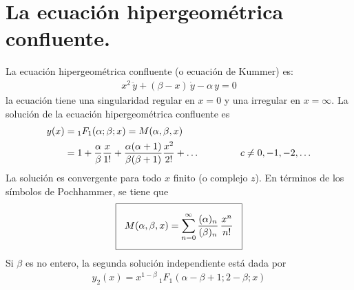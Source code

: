 \section{La ecuación hipergeométrica confluente.}
La ecuación hipergeométrica confluente (o ecuación de Kummer) es:
\begin{align*}
x^{2} \, \ddot{y} + (\beta - x) \, \dot{y} - \alpha \, y = 0
\end{align*}
la ecuación tiene una singularidad regular en $x=0$ y una irregular en $x=\infty$. La solución de la ecuación hipergeométrica confluente es
\begin{align*}
y(x) &= {}_{1} F_{1} (\alpha; \beta; x) = M(\alpha, \beta, x) \\
&= 1 + \dfrac{\alpha}{\beta} \dfrac{x}{1!} + \dfrac{\alpha (\alpha + 1)}{\beta (\beta + 1)} \dfrac{x^{2}}{2!} + \ldots \hspace{1.5cm} c \neq 0, -1, -2, \ldots 
\end{align*}
La solución es convergente para todo $x$ finito (o complejo $z$). En términos de los símbolos de Pochhammer, se tiene que
\begin{align*}
\setlength{\fboxsep}{3\fboxsep}\boxed{
M(\alpha, \beta, x) = \sum_{n=0}^{\infty} \dfrac{(\alpha)_{n}}{(\beta)_{n}} \, \dfrac{x^{n}}{n!}}
\end{align*}
Si $\beta$ es no entero, la segunda solución independiente está dada por
\begin{align*}
y_{2} (x) = x^{1-\beta} \, {}_{1} F_{1} (\alpha - \beta + 1; 2 - \beta; x)
\end{align*}
